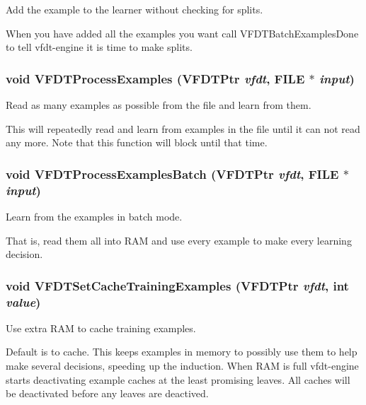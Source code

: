 Add the example to the learner without checking for splits. 

When you have added all the examples you want call VFDTBatch\-Examples\-Done to tell vfdt-engine it is time to make splits. 
\subsubsection{\setlength{\rightskip}{0pt plus 5cm}void VFDTProcess\-Examples ({\bf VFDTPtr} {\em vfdt}, FILE $\ast$ {\em input})}\label{vfdt-engine_8h_a15}


Read as many examples as possible from the file and learn from them. 

This will repeatedly read and learn from examples in the file until it can not read any more. Note that this function will block until that time. 
\subsubsection{\setlength{\rightskip}{0pt plus 5cm}void VFDTProcess\-Examples\-Batch ({\bf VFDTPtr} {\em vfdt}, FILE $\ast$ {\em input})}\label{vfdt-engine_8h_a16}


Learn from the examples in batch mode. 

That is, read them all into RAM and use every example to make every learning decision. 
\subsubsection{\setlength{\rightskip}{0pt plus 5cm}void VFDTSet\-Cache\-Training\-Examples ({\bf VFDTPtr} {\em vfdt}, int {\em value})}\label{vfdt-engine_8h_a11}


Use extra RAM to cache training examples. 

Default is to cache. This keeps examples in memory to possibly use them to help make several decisions, speeding up the induction. When RAM is full vfdt-engine starts deactivating example caches at the least promising leaves. All caches will be deactivated before any leaves are deactived. 
